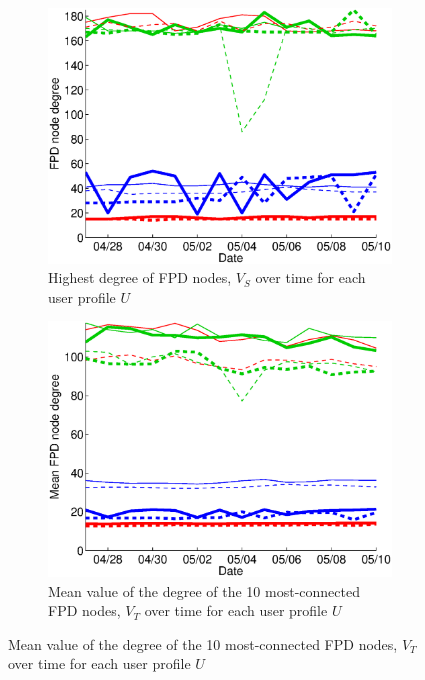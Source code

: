 \documentclass{sig-alternate}
\begin{document}
    \begin{figure}
   \centering
   \begin{subfigure}{.38\textwidth}
    \includegraphics[width=\textwidth]{figures/plots/first-mean-top1.eps}
    \caption{Highest degree of FPD nodes, $V_S$ over time for each user profile $U$}
    \label{fig:first_mean_top1_without_entities}
  \end{subfigure}
  \begin{subfigure}{.38\textwidth}
    \includegraphics[width=\textwidth]{figures/plots/first-mean-top10.eps}
    \caption{Mean value of the degree of the 10 most-connected FPD nodes, $V_T$ over time for each user profile $U$}
    \label{fig:first_mean_top10_without_entities}
  \end{subfigure}

\end{figure}
\end{document}
